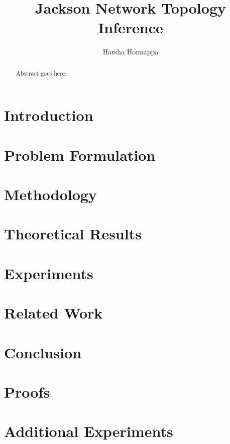 \documentclass[12pt]{amsart}
\title{Jackson Network Topology Inference}
\author{Harsha Honnappa}
\begin{document}
\maketitle

\begin{abstract}
Abstract goes here.
\end{abstract}

\section{Introduction}
\label{sec:intro}

\section{Problem Formulation}
\label{sec:problem}

\section{Methodology}
\label{sec:method}

\section{Theoretical Results}
\label{sec:theory}

\section{Experiments}
\label{sec:experiments}

\section{Related Work}
\label{sec:related}

\section{Conclusion}
\label{sec:conclusion}




\appendix
\section{Proofs}
\label{app:proofs}

\section{Additional Experiments}
\label{app:experiments}
\end{document}
